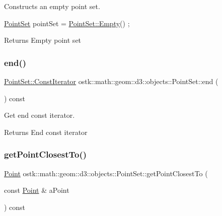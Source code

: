 Constructs an empty point set. 


\begin{DoxyCode}
\hyperlink{classostk_1_1math_1_1geom_1_1d3_1_1objects_1_1_point_set_a285835d8348a60ceaf227bd76e3a5546}{PointSet} pointSet = \hyperlink{classostk_1_1math_1_1geom_1_1d3_1_1objects_1_1_point_set_a1b14ed7d73ee7ac5e2796cf44f06ffe9}{PointSet::Empty}() ;
\end{DoxyCode}


\begin{DoxyReturn}{Returns}
Empty point set 
\end{DoxyReturn}
\mbox{\label{classostk_1_1math_1_1geom_1_1d3_1_1objects_1_1_point_set_ad15fd1b2a3609d6e24657118945b579f}} 
\subsubsection{\texorpdfstring{end()}{end()}}
{\footnotesize\ttfamily \hyperlink{classostk_1_1math_1_1geom_1_1d3_1_1objects_1_1_point_set_aa87eb9a571cb8b420e8c404005a2b723}{Point\+Set\+::\+Const\+Iterator} ostk\+::math\+::geom\+::d3\+::objects\+::\+Point\+Set\+::end (\begin{DoxyParamCaption}{ }\end{DoxyParamCaption}) const}



Get end const iterator. 

\begin{DoxyReturn}{Returns}
End const iterator 
\end{DoxyReturn}
\mbox{\label{classostk_1_1math_1_1geom_1_1d3_1_1objects_1_1_point_set_a55f63833c4c6fe3481a4f8833701907a}} 
\subsubsection{\texorpdfstring{get\+Point\+Closest\+To()}{getPointClosestTo()}}
{\footnotesize\ttfamily \hyperlink{classostk_1_1math_1_1geom_1_1d3_1_1objects_1_1_point}{Point} ostk\+::math\+::geom\+::d3\+::objects\+::\+Point\+Set\+::get\+Point\+Closest\+To (\begin{DoxyParamCaption}\item[{const \hyperlink{classostk_1_1math_1_1geom_1_1d3_1_1objects_1_1_point}{Point} \&}]{a\+Point }\end{DoxyParamCaption}) const}



